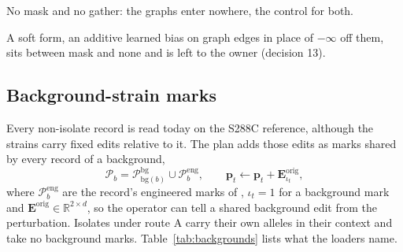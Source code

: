  No mask and no gather: the graphs enter nowhere, the control for both.

 A soft form, an additive learned bias on graph edges in place of
$-\infty$ off them, sits between mask and none and is left to the owner (decision 13).

\subsection{Background-strain marks}
\label{sec:background}

Every non-isolate record is read today on the S288C reference, although the strains carry
fixed edits relative to it. The plan adds those edits as marks shared by every record of a
background,
\begin{equation}
\mathcal{P}_b = \mathcal{P}^{\mathrm{bg}}_{\mathrm{bg}(b)} \cup \mathcal{P}^{\mathrm{eng}}_b,
\qquad
\mathbf{p}_t \leftarrow \mathbf{p}_t + \mathbf{E}^{\mathrm{orig}}_{\iota_t},
\label{eq:bgmarks}
\end{equation}
where $\mathcal{P}^{\mathrm{eng}}_b$ are the record's engineered marks of ,
$\iota_t = 1$ for a background mark and $\mathbf{E}^{\mathrm{orig}} \in \mathbb{R}^{2 \times
d}$, so the operator can tell a shared background edit from the perturbation. Isolates under
route A carry their own alleles in their context and take no background marks.
Table~\ref{tab:backgrounds} lists what the loaders name.

